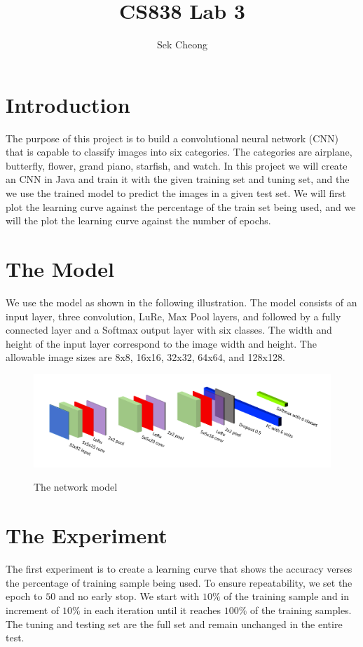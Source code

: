 \documentclass{article}
\begin{document}
\title{CS838 Lab 3}
\author{Sek Cheong}
\maketitle


\section{Introduction}
The purpose of this project is to build a convolutional neural network (CNN) that is capable to classify images into six categories. The categories are airplane, butterfly, flower, grand  piano, starfish, and  watch. In this project we will create an CNN in Java and train it with the given training set and tuning set, and the we use the trained model to predict the images in a given test set. We will first plot the learning curve against the percentage of the train set being used, and we will the plot the learning curve against the number of epochs. 

\section{The Model}
We use the model as shown in the following illustration. The model consists of an input layer, three convolution, LuRe, Max Pool layers, and followed by a fully connected layer and a Softmax output layer with six classes. The width and height of the input layer correspond to the image width and height. The allowable image sizes are 8x8, 16x16, 32x32, 64x64, and 128x128. 

\begin{figure}[!ht]
  \centering
  \includegraphics[width=4.5in]{layers.png}
  \label{networkmodel}
  \caption{The network model}
\end{figure}


\section{The Experiment}
The first experiment is to create a learning curve that shows the accuracy verses the percentage of training sample being used. To ensure repeatability, we set the epoch to $50$ and no early stop. We start with $10\%$ of the training sample and in increment of $10\%$ in each iteration until it reaches $100\%$ of the training samples. The tuning and testing set are the full set and remain unchanged in the entire test. 
\end{document}
